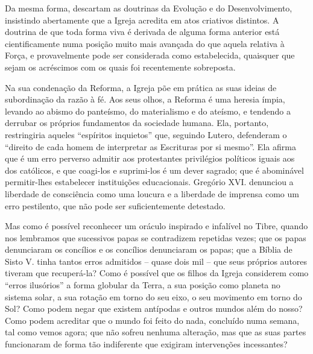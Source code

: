 \documentclass[11pt,a5paper,twoside,openany]{book}
\begin{document}
Da mesma forma, descartam as doutrinas da Evolução e do Desenvolvimento, insistindo abertamente que a Igreja acredita em atos criativos distintos. A doutrina de que toda forma viva é derivada de alguma forma anterior está cientificamente numa posição muito mais avançada do que aquela relativa à Força, e provavelmente pode ser considerada como estabelecida, quaisquer que sejam os acréscimos com os quais foi recentemente sobreposta.

Na sua condenação da Reforma, a Igreja põe em prática as suas ideias de subordinação da razão à fé. Aos seus olhos, a Reforma é uma heresia ímpia, levando ao abismo do panteísmo, do materialismo e do ateísmo, e tendendo a derrubar os próprios fundamentos da sociedade humana. Ela, portanto, restringiria aqueles “espíritos inquietos” que, seguindo Lutero, defenderam o “direito de cada homem de interpretar as Escrituras por si mesmo”. Ela afirma que é um erro perverso admitir aos protestantes privilégios políticos iguais aos dos católicos, e que coagi-los e suprimi-los é um dever sagrado; que é abominável permitir-lhes estabelecer instituições educacionais. Gregório XVI. denunciou a liberdade de consciência como uma loucura e a liberdade de imprensa como um erro pestilento, que não pode ser suficientemente detestado.

Mas como é possível reconhecer um oráculo inspirado e infalível no Tibre, quando nos lembramos que sucessivos papas se contradizem repetidas vezes; que os papas denunciaram os concílios e os concílios denunciaram os papas; que a Bíblia de Sisto V. tinha tantos erros admitidos – quase dois mil – que seus próprios autores tiveram que recuperá-la? Como é possível que os filhos da Igreja considerem como “erros ilusórios” a forma globular da Terra, a sua posição como planeta no sistema solar, a sua rotação em torno do seu eixo, o seu movimento em torno do Sol? Como podem negar que existem antípodas e outros mundos além do nosso? Como podem acreditar que o mundo foi feito do nada, concluído numa semana, tal como vemos agora; que não sofreu nenhuma alteração, mas que as suas partes funcionaram de forma tão indiferente que exigiram intervenções incessantes?
\end{document}
